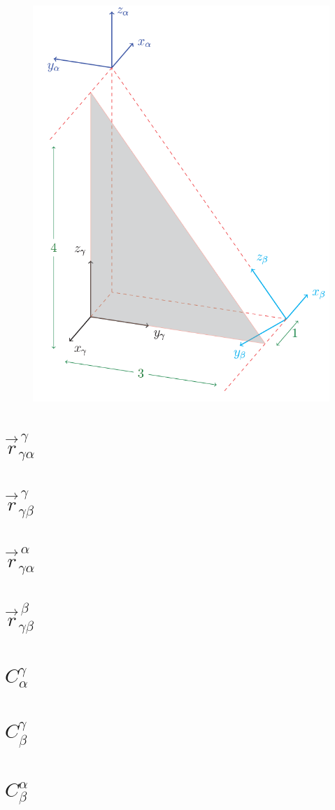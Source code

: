 \documentclass[12pt,letterpaper, onecolumn]{exam}
\begin{document}
\begin{questions}
{\begin{figure}[!h]
            \includegraphics[width=0.85\linewidth]{Q9.png}
        \end{figure}
        \clearpage
        \begin{parts}
            \part{$\vec{r}^{\,\gamma}_{\gamma\alpha}$}
            \part{$\vec{r}^{\,\gamma}_{\gamma\beta}$}
            \part{$\vec{r}^{\,\alpha}_{\gamma\alpha}$}
            \part{$\vec{r}^{\,\beta}_{\gamma\beta}$}
            \part{${C}^{\gamma}_{\alpha}$}
            \part{${C}^{\gamma}_{\beta}$}
            \part{${C}^{\alpha}_{\beta}$}
        \end{parts}
    }

\end{questions}
\end{document}
